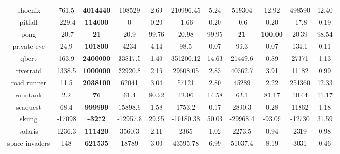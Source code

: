\begin{center}
\begin{tabular}{ccccccccccc}
 phoenix            & 761.5     & \textbf{4014440}   & 108529   &2.69    & 210996.45  & 5.24       & 519304  & 12.92                                & 498590           & 12.40           \\
 pitfall            & -229.4    & \textbf{114000}    & 0        &0.20    & -1.66      & 0.20       & -0.6    & 0.20               & -17.8            & 0.19     \\
 pong               & -20.7     & \textbf{21}                 & 20.9     &99.76   & 20.98      & 99.95      & \textbf{21}      & \textbf{100.00}    & 20.39           & 98.54    \\
 private eye        & 24.9      & \textbf{101800}    & 4234     &4.14    & 98.5       & 0.07       & 96.3    & 0.07                                 & 134.1           & 0.11         \\
 qbert              & 163.9     & \textbf{2400000}   & 33817.5  &1.40    & 351200.12  & 14.63      & 21449.6 & 0.89                                 & 27371            & 1.13     \\
 riverraid          & 1338.5    & \textbf{1000000}   & 22920.8  &2.16    & 29608.05   & 2.83       & 40362.7 & 3.91                                 & 11182            & 0.99    \\
 road runner        & 11.5      & \textbf{2038100}   & 62041    &3.04    & 57121      & 2.80       & 45289   & 2.22                                 & 251360            & 12.33          \\
 robotank           & 2.2       & \textbf{76}                 & 61.4     &80.22   & 12.96      & 14.58      & 62.1    & 81.17                                & 10.44            & 11.17 \\
 seaquest           & 68.4      & \textbf{999999}             & 15898.9  &1.58    & 1753.2     & 0.17       & 2890.3  & 0.28                                 & 11862          & 1.18 \\
 skiing             & -17098    & \textbf{-3272}     & -12957.8 &29.95   & -10180.38  & 50.03      & -29968.4& -93.09                               & -12730            & 31.59       \\
 solaris            & 1236.3    & \textbf{111420}    & 3560.3   &2.11    & 2365       & 1.02       & 2273.5  & 0.94                                 & 2319           & 0.98      \\
 space invaders     & 148       & \textbf{621535 }   & 18789    &3.00    & 43595.78   & 6.99       & 51037.4 & 8.19                                 & 3031           & 0.46            \\

\end{tabular}
\end{center}
